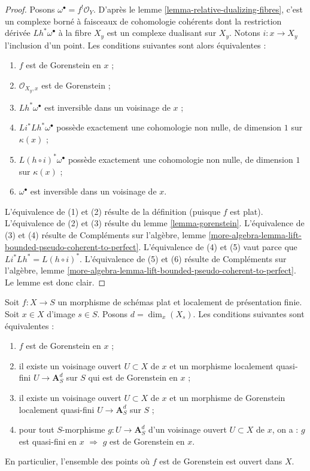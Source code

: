 \begin{proof}
Posons $\omega^\bullet = f^!\mathcal{O}_Y$. D'après le lemme \ref{lemma-relative-dualizing-fibres}, c'est un complexe borné à faisceaux de cohomologie cohérents dont la restriction dérivée $Lh^*\omega^\bullet$ à la fibre $X_y$ est un complexe dualisant sur $X_y$. Notons $i : x \to X_y$ l'inclusion d'un point. Les conditions suivantes sont alors équivalentes :
\begin{enumerate}
\item $f$ est de Gorenstein en $x$ ;
\item $\mathcal{O}_{X_y, x}$ est de Gorenstein ;
\item $Lh^*\omega^\bullet$ est inversible dans un voisinage de $x$ ;
\item $Li^* Lh^* \omega^\bullet$ possède exactement une cohomologie non nulle, de dimension $1$ sur $\kappa(x)$ ;
\item $L(h \circ i)^* \omega^\bullet$ possède exactement une cohomologie non nulle, de dimension $1$ sur $\kappa(x)$ ;
\item $\omega^\bullet$ est inversible dans un voisinage de $x$.
\end{enumerate}
L'équivalence de (1) et (2) résulte de la définition (puisque $f$ est plat). L'équivalence de (2) et (3) résulte du lemme \ref{lemma-gorenstein}. L'équivalence de (3) et (4) résulte de Compléments sur l'algèbre, lemme \ref{more-algebra-lemma-lift-bounded-pseudo-coherent-to-perfect}. L'équivalence de (4) et (5) vaut parce que $Li^* Lh^* = L(h \circ i)^*$. L'équivalence de (5) et (6) résulte de Compléments sur l'algèbre, lemme \ref{more-algebra-lemma-lift-bounded-pseudo-coherent-to-perfect}. Le lemme est donc clair.
\end{proof}

\begin{lemma}
\label{lemma-flat-finite-presentation-characterize-gorenstein}
Soit $f : X \to S$ un morphisme de schémas plat et localement de présentation finie. Soit $x \in X$ d'image $s \in S$. Posons $d = \dim_x(X_s)$. Les conditions suivantes sont équivalentes :
\begin{enumerate}
\item $f$ est de Gorenstein en $x$ ;
\item il existe un voisinage ouvert $U \subset X$ de $x$ et un morphisme localement quasi-fini $U \to \mathbf{A}^d_S$ sur $S$ qui est de Gorenstein en $x$ ;
\item il existe un voisinage ouvert $U \subset X$ de $x$ et un morphisme de Gorenstein localement quasi-fini $U \to \mathbf{A}^d_S$ sur $S$ ;
\item pour tout $S$-morphisme $g : U \to \mathbf{A}^d_S$ d'un voisinage ouvert $U \subset X$ de $x$, on a : $g$ est quasi-fini en $x$ $\Rightarrow$ $g$ est de Gorenstein en $x$.
\end{enumerate}
En particulier, l'ensemble des points où $f$ est de Gorenstein est ouvert dans $X$.
\end{lemma}

